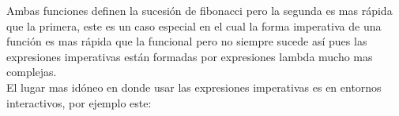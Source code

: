      Ambas funciones definen la sucesión de fibonacci pero la segunda es mas rápida que la primera, este es un caso especial en el cual la forma imperativa de una función es mas rápida que la funcional pero no siempre sucede así pues las expresiones imperativas están formadas por expresiones lambda mucho mas complejas.
      \\
      
      El lugar mas idóneo en donde usar las expresiones imperativas es en entornos interactivos, por ejemplo este:
      
      \begin{fxcode}
         \\
         \\
         \\
         \\
         \\
         \\
         \\
         \\
         \\
         \\
         \\
         \\
         \\
         \\
         \\
         \\
         \\
      \end{fxcode}
      
